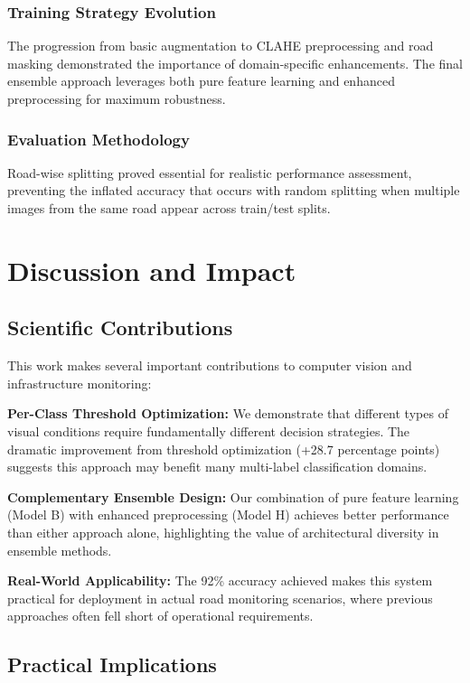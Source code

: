 \documentclass[12pt,twocolumn]{article}
\begin{document}
\subsubsection{Training Strategy Evolution}

The progression from basic augmentation to CLAHE preprocessing and road masking demonstrated the importance of domain-specific enhancements. The final ensemble approach leverages both pure feature learning and enhanced preprocessing for maximum robustness.

\subsubsection{Evaluation Methodology}

Road-wise splitting proved essential for realistic performance assessment, preventing the inflated accuracy that occurs with random splitting when multiple images from the same road appear across train/test splits.

\section{Discussion and Impact}

\subsection{Scientific Contributions}

This work makes several important contributions to computer vision and infrastructure monitoring:

\textbf{Per-Class Threshold Optimization:} We demonstrate that different types of visual conditions require fundamentally different decision strategies. The dramatic improvement from threshold optimization (+28.7 percentage points) suggests this approach may benefit many multi-label classification domains.

\textbf{Complementary Ensemble Design:} Our combination of pure feature learning (Model B) with enhanced preprocessing (Model H) achieves better performance than either approach alone, highlighting the value of architectural diversity in ensemble methods.

\textbf{Real-World Applicability:} The 92\% accuracy achieved makes this system practical for deployment in actual road monitoring scenarios, where previous approaches often fell short of operational requirements.

\subsection{Practical Implications}
\end{document}
